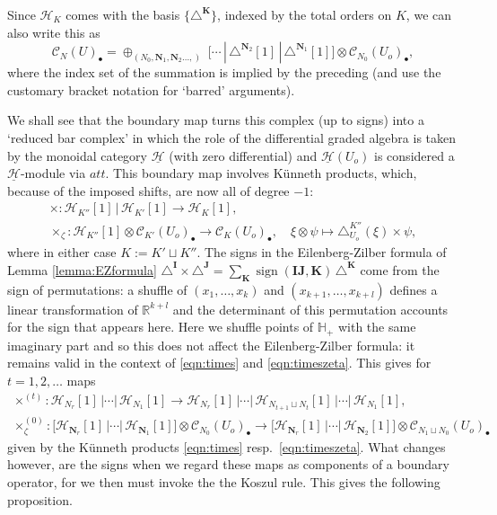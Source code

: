 \documentclass[12pt,letterpaper]{amsart}
\numberwithin{equation}{section}
\def\HH{{\mathbb H}}
\def\Kbold{{\mathbf K}}
\def\Nbold{{\mathbf N}}
\def\RR{{\mathbb R}}
\def\Ibold{\mathbf {I}}
\def\Jbold{\mathbf {J}}
\def\tri{\triangle}
\def\Ccal{{\mathcal C}}
\def\Hcal{{\mathcal H}}
\def\uHcal{{\underline\Hcal}}
\def\Cscr{{\mathscr C}}
\def\pt{{\scriptscriptstyle\bullet}}
\newcommand\sign{\operatorname{sign}}
\theoremstyle{remark}
\begin{document}
Since $\Hcal_{K}$ comes with the basis 
$\{\tri^{\Kbold}\}$, indexed by the total orders on $K$, we can   also write this as 
\[
\Cscr_N(U)_\pt=\oplus_{(N_0, \Nbold_1,\Nbold_2 \dots ,)}\; \big[\cdots  \, |\, \tri^{\Nbold_2}[1] \, |\, \tri^{\Nbold_1}[1]\big]\otimes\Ccal_{N_0}(U_o)_\pt,
\]
where the index set of the summation is implied by the preceding (and use the customary bracket notation for `barred' arguments). 

We  shall  see that  the  boundary map turns this complex (up to signs) into a  `reduced bar complex' in which the role of the differential graded algebra is taken by
the monoidal category $\uHcal$ (with zero differential) and $\uHcal(U_o)$ is considered a $\uHcal$-module via $att$.
This boundary map involves  K\"unneth products, which,  because of  the imposed shifts,  are now all of degree $-1$:
\begin{gather}
\times: \Hcal_{K''} [1] \, \big|\, \Hcal_{K'}[1]\to \Hcal_{K} [1], \label{eqn:times}\\
\times_{\zeta}: \Hcal_{K''}[1]\otimes \Ccal_{K'}(U_o)_\pt\to \Ccal_{K}(U_o)_\pt, \quad \xi\otimes \psi\mapsto \tri^{K''}_{U_o}(\xi)\times\psi, \label{eqn:timeszeta}  
\end{gather}
where in either case $K:=K'\sqcup K''$. The signs in the Eilenberg-Zilber formula of Lemma \ref{lemma:EZformula} 
$\tri^\Ibold\times \tri^\Jbold=\sum_\Kbold \sign(\Ibold\Jbold,\Kbold) \hspace{2pt} \tri^\Kbold$ 
come from the sign of permutations:  a shuffle of  $(x_1,\dots , x_k)$ and $(x_{k+1},\dots , x_{k+l})$ defines a linear transformation of $\RR^{k+l}$
and the determinant of this permutation accounts for the sign that appears here. Here we shuffle points of $\HH_+$ with the same imaginary part 
and so this does not affect the  Eilenberg-Zilber formula: it remains valid  in the context of \eqref{eqn:times} and \eqref{eqn:timeszeta}.
This  gives for $t=1,2,\dots$ maps
\begin{gather*}
\times^{(t)}:\Hcal_{N_r}[1]\, |\cdots |\, \Hcal_{N_1}[1]\to \Hcal_{N_r}[1]\, |\cdots |\,\Hcal_{N_{t+1}\sqcup N_t}[1]\, |\cdots |\, \Hcal_{N_1}[1],\\
\times^{(0)}_{\zeta}: \big[\Hcal_{\Nbold_r}[1]\, |\cdots |\, \Hcal_{\Nbold_1}[1]\big]\otimes  \Cscr_{N_0}(U_o)_\pt\to\big[\Hcal_{\Nbold_r}[1]\, |\cdots |\, \Hcal_{\Nbold_2}[1]\big]\otimes  \Cscr_{N_1\sqcup N_0}(U_o)_\pt
\end{gather*}
given  by  the K\"unneth products  \eqref{eqn:times} resp.\ \eqref{eqn:timeszeta}.
What changes however, are the signs when we regard these maps as components of a boundary operator, for we then must invoke the 
the Koszul rule. This  gives the  following proposition.
\end{document}
